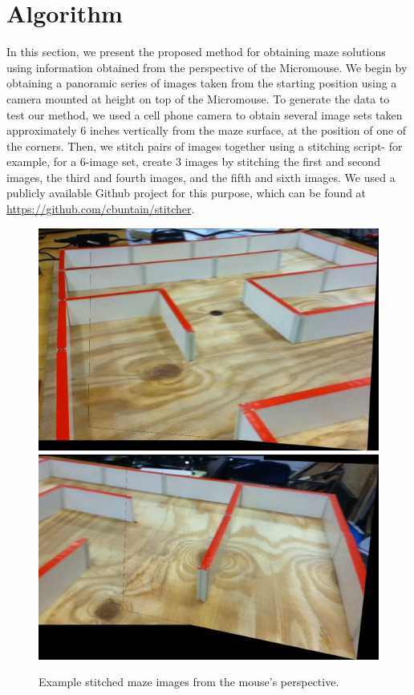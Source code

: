 \documentclass[10pt,twocolumn,letterpaper]{article}
\begin{document}
\section{Algorithm}
\label{sec:algorithm}
In this section, we present the proposed method for obtaining maze solutions using information obtained from the
perspective of the Micromouse.  We begin by obtaining a panoramic series of images taken from the starting position
using a camera mounted at height on top of the Micromouse.  To generate the data to test our method, we used a cell
phone camera to obtain several image sets taken approximately 6 inches vertically from the maze surface, at the position
of one of the corners.  Then, we stitch pairs of images together using a stitching script- for example, for a 6-image
set, create 3 images by stitching the first and second images, the third and fourth images, and the fifth and sixth
images.  We used a publicly available Github project for this purpose, which can be found at
\url{https://github.com/cbuntain/stitcher}.

\begin{figure}[t]
\begin{center}
	\includegraphics[width=0.8\linewidth]{../../src/imgs/one.jpg}
	\includegraphics[width=0.8\linewidth]{../../src/imgs/three.jpg}
\end{center}
\caption{Example stitched maze images from the mouse's perspective.}
\label{fig:stitched}
\end{figure}
\end{document}
